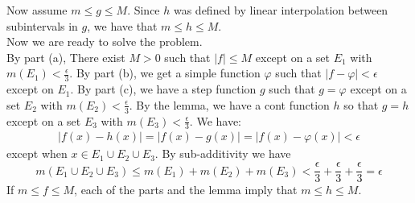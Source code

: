 \documentclass[12pt]{article}
\begin{document}
Now assume $m \le g \le M$. Since $h$ was defined by linear interpolation between subintervals in $g$, we have that $m \le h \le M$. \\
Now we are ready to solve the problem. \\
By part (a), There exist $M>0$ such that $|f| \le M$ except on a set $E_1$ with $m(E_1) < \frac{\epsilon}{3}$. By part (b), we get a simple function $\varphi$ such that $|f-\varphi| < \epsilon$ except on $E_1$. By part (c), we have a step function $g$ such that $g=\varphi$ except on a set $E_2$ with $m(E_2) < \frac{\epsilon}{3}$. 
By the lemma, we have a cont function $h$ so that $g=h$ except on a set $E_3$ with $m(E_3) < \frac{\epsilon}{3}$. We have:
\begin{eqnarray*}
|f(x)-h(x)|=|f(x)-g(x)|=|f(x)-\varphi(x)| < \epsilon
\end{eqnarray*}
except when $x \in E_1 \cup E_2 \cup E_3$.
By sub-additivity we have
$$m(E_1 \cup E_2 \cup E_3) \le m(E_1)+m(E_2)+m(E_3)
< \frac{\epsilon}{3} +\frac{\epsilon}{3}+\frac{\epsilon}{3}= \epsilon$$
If $m \le f \le M$, each of the parts and the lemma imply that $m \le h \le M$.
\end{document}
